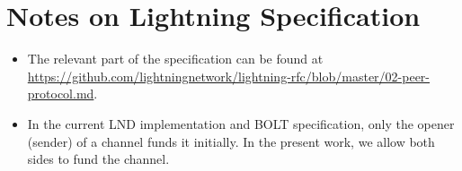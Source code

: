 \section{Notes on Lightning Specification}
\begin{itemize}
  \item The relevant part of the specification can be found at
  \url{https://github.com/lightningnetwork/lightning-rfc/blob/master/02-peer-protocol.md}.
  \item In the current LND implementation and BOLT specification, only the
  opener (sender) of a channel funds it initially. In the present work, we allow
  both sides to fund the channel.
\end{itemize}
